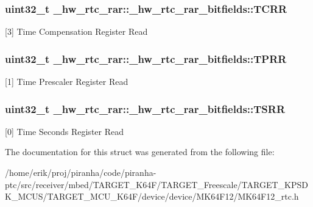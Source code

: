 \subsubsection[{\texorpdfstring{T\+C\+RR}{TCRR}}]{\setlength{\rightskip}{0pt plus 5cm}uint32\+\_\+t \+\_\+hw\+\_\+rtc\+\_\+rar\+::\+\_\+hw\+\_\+rtc\+\_\+rar\+\_\+bitfields\+::\+T\+C\+RR}\hypertarget{struct__hw__rtc__rar_1_1__hw__rtc__rar__bitfields_a48d32a747b4b64e8f9462e706a581386}{}\label{struct__hw__rtc__rar_1_1__hw__rtc__rar__bitfields_a48d32a747b4b64e8f9462e706a581386}
\mbox{[}3\mbox{]} Time Compensation Register Read 
\subsubsection[{\texorpdfstring{T\+P\+RR}{TPRR}}]{\setlength{\rightskip}{0pt plus 5cm}uint32\+\_\+t \+\_\+hw\+\_\+rtc\+\_\+rar\+::\+\_\+hw\+\_\+rtc\+\_\+rar\+\_\+bitfields\+::\+T\+P\+RR}\hypertarget{struct__hw__rtc__rar_1_1__hw__rtc__rar__bitfields_a6e50f470158e4b98e44830025badaa34}{}\label{struct__hw__rtc__rar_1_1__hw__rtc__rar__bitfields_a6e50f470158e4b98e44830025badaa34}
\mbox{[}1\mbox{]} Time Prescaler Register Read 
\subsubsection[{\texorpdfstring{T\+S\+RR}{TSRR}}]{\setlength{\rightskip}{0pt plus 5cm}uint32\+\_\+t \+\_\+hw\+\_\+rtc\+\_\+rar\+::\+\_\+hw\+\_\+rtc\+\_\+rar\+\_\+bitfields\+::\+T\+S\+RR}\hypertarget{struct__hw__rtc__rar_1_1__hw__rtc__rar__bitfields_a2574ea7ceef8c18615ee3ec5858c47c4}{}\label{struct__hw__rtc__rar_1_1__hw__rtc__rar__bitfields_a2574ea7ceef8c18615ee3ec5858c47c4}
\mbox{[}0\mbox{]} Time Seconds Register Read 

The documentation for this struct was generated from the following file\+:\begin{DoxyCompactItemize}
\item 
/home/erik/proj/piranha/code/piranha-\/ptc/src/receiver/mbed/\+T\+A\+R\+G\+E\+T\+\_\+\+K64\+F/\+T\+A\+R\+G\+E\+T\+\_\+\+Freescale/\+T\+A\+R\+G\+E\+T\+\_\+\+K\+P\+S\+D\+K\+\_\+\+M\+C\+U\+S/\+T\+A\+R\+G\+E\+T\+\_\+\+M\+C\+U\+\_\+\+K64\+F/device/device/\+M\+K64\+F12/M\+K64\+F12\+\_\+rtc.\+h\end{DoxyCompactItemize}
